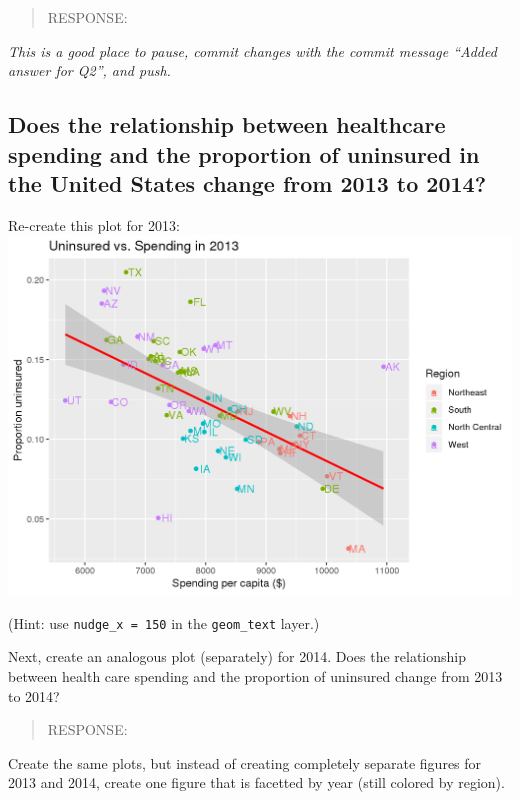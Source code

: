 \documentclass[
]{article}
\begin{document}
\begin{quote}
RESPONSE:
\end{quote}

\emph{This is a good place to pause, commit changes with the commit
message ``Added answer for Q2'', and push.}

\hypertarget{does-the-relationship-between-healthcare-spending-and-the-proportion-of-uninsured-in-the-united-states-change-from-2013-to-2014}{%
\subsection{Does the relationship between healthcare spending and the
proportion of uninsured in the United States change from 2013 to
2014?}\label{does-the-relationship-between-healthcare-spending-and-the-proportion-of-uninsured-in-the-united-states-change-from-2013-to-2014}}

Re-create this plot for 2013:
\includegraphics{images/uninsured_spending_2013.png}

(Hint: use \texttt{nudge\_x\ =\ 150} in the \texttt{geom\_text} layer.)

Next, create an analogous plot (separately) for 2014. Does the
relationship between health care spending and the proportion of
uninsured change from 2013 to 2014?

\begin{quote}
RESPONSE:
\end{quote}

Create the same plots, but instead of creating completely separate
figures for 2013 and 2014, create one figure that is facetted by year
(still colored by region).
\end{document}

